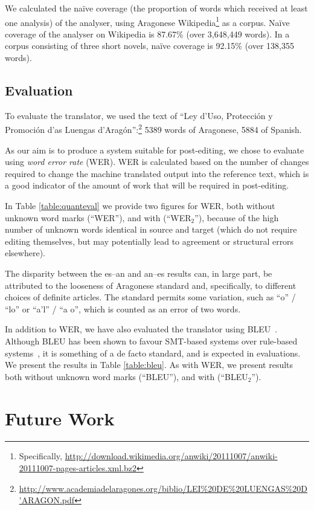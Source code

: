 \documentclass[10pt,a4paper,twocolumn]{article}
\begin{document}
We calculated the naïve coverage (the proportion of words which received at least one analysis) of the analyser, using Aragonese Wikipedia\footnote{Specifically, \url{http://download.wikimedia.org/anwiki/20111007/anwiki-20111007-pages-articles.xml.bz2}} as a corpus. Naïve coverage of the analyser on Wikipedia is 87.67\% (over 3,648,449 words).  In a corpus consisting of three short novels, naïve coverage is 92.15\% (over 138,355 words).
  
  \subsection{Evaluation}
  
  To evaluate the translator, we used the text of ``Ley d'Uso, Protección y Promoción d'as Luengas d'Aragón'':\footnote{\url{http://www.academiadelaragones.org/biblio/LEI\%20DE\%20LUENGAS\%20D'ARAGON.pdf}} 5389 words of Aragonese, 5884 of Spanish.
  
  As our aim is to produce a system suitable for post-editing, we chose to evaluate using \emph{word error rate} (WER). WER is calculated based on the number of changes required to change the machine translated output into the reference text, which is a good indicator of the amount of work that will be required in post-editing.
  
  In Table \ref{table:quanteval} we provide two figures for WER, both without unknown word marks (``WER''), and with (``WER$_2$''), because of the high number of unknown words identical in source and target (which do not require editing themselves, but may potentially lead to agreement or structural errors elsewhere).
  
  The disparity between the es--an and an--es results can, in large part, be attributed to the looseness of Aragonese standard and, specifically, to different choices of definite articles. The standard permits some variation, such as ``o'' / ``lo''  or ``a'l'' / ``a o'', which is counted as an error of two words.
  
  In addition to WER, we have also evaluated the translator using BLEU~\cite{bleu}. Although BLEU has been shown to favour SMT-based systems over rule-based systems~\cite{burch}, it is something of a de facto standard, and is expected in evaluations. We present the results in Table \ref{table:bleu}. As with WER, we present results both without unknown word marks (``BLEU''), and with (``BLEU$_2$'').

\section{Future Work}
  
\end{document}
